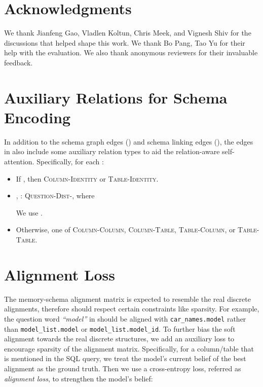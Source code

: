 \documentclass[11pt,a4paper,final]{article}
\begin{document}
\section*{Acknowledgments}
We thank Jianfeng Gao, Vladlen Koltun, Chris Meek, and Vignesh Shiv for the discussions that helped shape this work.
We thank Bo Pang, Tao Yu for their help with the evaluation.
We also thank anonymous reviewers for their invaluable feedback.




\newpage
\appendix












\section{Auxiliary Relations for Schema Encoding}
\label{app:schema-encoding}
In addition to the schema graph edges  ()
and schema linking edges (),
the edges in  also include some auxiliary relation types
to aid the relation-aware self-attention.
Specifically, for each :
\begin{itemize}
    \item If , then \textsc{Column-Identity} or \textsc{Table-Identity}.
    \item , :
       \textsc{Question-Dist-}, where
       
       We use .
    \item Otherwise, one of \textsc{Column-Column}, \textsc{Column-Table}, \textsc{Table-Column}, or
        \textsc{Table-Table}.
\end{itemize}

\section{Alignment Loss}
\label{app:align_loss}

The memory-schema alignment matrix is expected to resemble the real discrete alignments, therefore
should respect certain constraints like sparsity.
For example, the question word \textit{``model''} in  should be aligned with
\texttt{car\_names.model} rather than \mbox{\texttt{model\_list.model}} or \mbox{\texttt{model\_list.model\_id}}.
To further bias the soft alignment towards the real discrete structures,
we add an auxiliary loss to encourage sparsity of the alignment matrix.
Specifically, for a column/table that is mentioned in the SQL query,
we treat the model's current belief of the best alignment as the ground truth.
Then we use a cross-entropy loss, referred as \textit{alignment loss},
to strengthen the model's belief:
\end{document}

